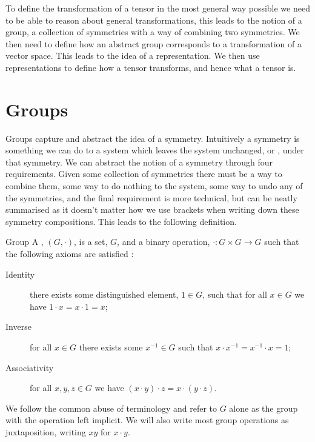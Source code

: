 \documentclass[fleqn]{NotesClass}
\newcommand{\identity}{1}
\begin{document}
    To define the transformation of a tensor in the most general way possible we need to be able to reason about general transformations, this leads to the notion of a group, a collection of symmetries with a way of combining two symmetries.
    We then need to define how an abstract group corresponds to a transformation of a vector space.
    This leads to the idea of a representation.
    We then use representations to define how a tensor transforms, and hence what a tensor is.
    
    \section{Groups}
    Groups capture and abstract the idea of a symmetry.
    Intuitively a symmetry is something we can do to a system which leaves the system unchanged, or , under that symmetry.
    We can abstract the notion of a symmetry through four requirements.
    Given some collection of symmetries there must be a way to combine them, some way to do nothing to the system, some way to undo any of the symmetries, and the final requirement is more technical, but can be neatly summarised as it doesn't matter how we use brackets when writing down these symmetry compositions.
    This leads to the following definition.
    
    \begin{dfn}{Group}{}
        A , \((G, \cdot)\), is a set, \(G\), and a binary operation, \(\cdot \colon G \times G \to G\) such that the following axioms are satisfied \cite{riley-hobson-bence}:
        \begin{description}
            \item[Identity] there exists some distinguished element, \(\identity \in G\), such that for all \(x \in G\) we have \(\identity \cdot x = x \cdot \identity = x\);
            \item[Inverse] for all \(x \in G\) there exists some \(x^{-1} \in G\) such that \(x \cdot x^{-1} = x^{-1} \cdot x = \identity\);
            \item[Associativity] for all \(x, y, z \in G\) we have \((x \cdot y) \cdot z = x \cdot (y \cdot z)\).
        \end{description}
    \end{dfn}
    
    We follow the common abuse of terminology and refer to \(G\) alone as the group with the operation left implicit.
    We will also write most group operations as juxtaposition, writing \(xy\) for \(x \cdot y\).
    
\end{document}
